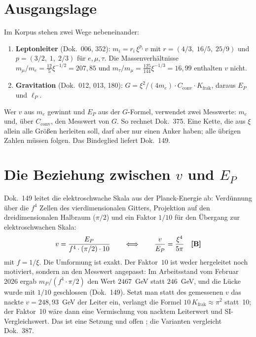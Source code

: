 \section{Ausgangslage}
Im Korpus stehen zwei Wege nebeneinander:
\begin{enumerate}
\item \textbf{Leptonleiter} (Dok.~006, 352): $m_i=r_i\,\xi^{p_i}\,v$ mit
  $r=(4/3,\;16/5,\;25/9)$ und $p=(3/2,\;1,\;2/3)$ für $e,\mu,\tau$. Die
  Massenverhältnisse $m_\mu/m_e=\tfrac{12}{5}\xi^{-1/2}=207{,}85$ und
  $m_\tau/m_\mu=\tfrac{125}{144}\xi^{-1/3}=16{,}99$ enthalten $v$ nicht.
\item \textbf{Gravitation} (Dok.~012, 013, 180):
  $G=\xi^2/(4m_e)\cdot C_{\text{conv}}\cdot K_{\text{frak}}$, daraus $E_P$ und $\ell_P$.
\end{enumerate}
Wer $v$ aus $m_e$ gewinnt und $E_P$ aus der $G$-Formel, verwendet zwei Messwerte:
$m_e$ und, über $C_{\text{conv}}$, den Messwert von $G$. So rechnet Dok.~375. Eine
Kette, die aus $\xi$ allein alle Größen herleiten soll, darf aber nur einen Anker
haben; alle übrigen Zahlen müssen folgen. Das Bindeglied liefert Dok.~149.

\section{Die Beziehung zwischen \texorpdfstring{$v$}{v} und \texorpdfstring{$E_P$}{E\_P}}
Dok.~149 leitet die elektroschwache Skala aus der Planck-Energie ab: Verdünnung über
die $f^4$ Zellen des vierdimensionalen Gitters, Projektion auf den dreidimensionalen
Halbraum ($\pi/2$) und ein Faktor $1/10$ für den Übergang zur elektroschwachen Skala:
\begin{equation}
  v=\frac{E_P}{f^4\cdot(\pi/2)\cdot10}
  \qquad\Longleftrightarrow\qquad
  \frac{v}{E_P}=\frac{\xi^4}{5\pi}\quad\textbf{[B]}
\end{equation}
mit $f=1/\xi$. Die Umformung ist exakt. Der Faktor~$10$ ist weder hergeleitet noch
motiviert, sondern an den Messwert angepasst: Im Arbeitsstand vom Februar 2026 ergab
$m_P/(f^4\cdot\pi/2)$ den Wert $2467$~GeV statt $246$~GeV, und die Lücke wurde mit
$1/10$ geschlossen (Dok.~149). Setzt man statt des gemessenen $v$ das nackte
$v=248{,}93$~GeV der Leiter ein, verlangt die Formel $10\,K_{\text{frak}}\approx\pi^2$
statt~10; der Faktor~10 wäre dann eine Vermischung von nacktem Leiterwert und
SI-Vergleichswert. Das ist eine Setzung und offen \SM; die Varianten vergleicht
Dok.~387.

